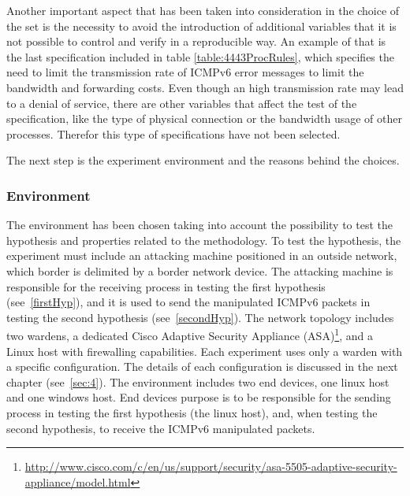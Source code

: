 \documentclass[12pt]{article}
\begin{document}
Another important aspect that has been taken into consideration in the choice of the set is the necessity to avoid the introduction of additional variables that it is not possible to control and verify in a reproducible way. An example of that is the last specification included in table \ref{table:4443ProcRules}, which specifies the need to limit the transmission rate of ICMPv6 error messages to limit the bandwidth and forwarding costs. Even though an high transmission rate may lead to a denial of service, there are other variables that affect the test of the specification, like the type of physical connection or the bandwidth usage of other processes. Therefor this type of specifications have not been selected.

The next step is the experiment environment and the reasons behind the choices.

\subsubsection{Environment}
\label{subsub:enviroment}

The environment has been chosen taking into account the possibility to test the hypothesis and properties related to the methodology. To test the hypothesis, the experiment must include an attacking machine positioned in an outside network, which border is delimited by a border network device. The attacking machine is responsible for the receiving process in testing the first hypothesis (see~\ref{firstHyp}), and it is used to send the manipulated ICMPv6 packets in testing the second hypothesis (see~\ref{secondHyp}). The network topology includes two wardens, a dedicated Cisco Adaptive Security Appliance (ASA)\footnote{\url{http://www.cisco.com/c/en/us/support/security/asa-5505-adaptive-security-appliance/model.html}}, and a Linux host with firewalling capabilities. Each experiment uses only a warden with a specific configuration. The details of each configuration is discussed in the next chapter (see~\ref{sec:4}). The environment includes two end devices, one linux host and one windows host. End devices purpose is to be responsible for the sending process in testing the first hypothesis (the linux host), and, when testing the second hypothesis, to receive the ICMPv6 manipulated packets.
\end{document}
